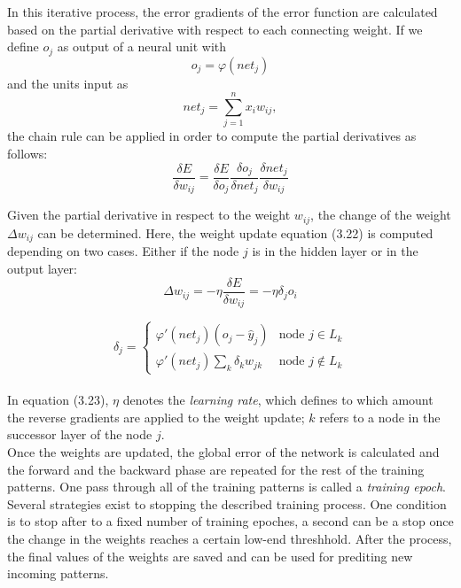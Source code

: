 In this iterative process, the error gradients of the error function are calculated based on the partial derivative with respect to each connecting weight. If we define $o_j$ as output of a neural unit with
\begin{equation}
  o_j = \varphi(net_j)
\end{equation}
and the units input as 
\begin{equation}
  net_j = \sum_{j=1}^{n}x_{i}w_{ij},
\end{equation}
the chain rule can be applied in order to compute the partial derivatives as follows:
\begin{equation}
  \frac{\delta E}{\delta w_{ij}} = \frac{\delta E}{\delta o_j} \frac{\delta o_j}{\delta net_j} \frac{\delta net_j}{\delta w_{ij}}
\end{equation}

Given the partial derivative in respect to the weight $w_{ij}$, the change of the weight $\Delta w_{ij}$ can be determined. Here, the weight update equation (3.22) is computed depending on two cases. Either if the node $j$ is in the hidden layer or in the output layer:
\begin{equation}
  \Delta w_{ij} = -\eta \frac{\delta E}{\delta w_{ij}} = - \eta \delta_j o_i
\end{equation}

\begin{equation}
  \delta_j =
  \begin{cases}
    \varphi'(net_j)(o_j - \hat{y}_j) & \text{node $j \in L_k$}\\
    \varphi'(net_j) \sum_k \delta_k w_{jk} & \text{node $j \notin L_k$}
  \end{cases}
\end{equation}
\\
In equation (3.23), $\eta$ denotes the \textit{learning rate}, which defines to which amount the reverse gradients are applied to the weight update; $k$ refers to a node in the successor layer of the node $j$.\\

Once the weights are updated, the global error of the network is calculated and the forward and the backward phase are repeated for the rest of the training patterns. One pass through all of the training patterns is called a \textit{training
epoch}. Several strategies exist to stopping the described training process. One condition is to stop after to a fixed number of training epoches, a second can be a stop once the change in the weights reaches a certain low-end threshhold. After the process, the final values of the weights are saved and can be used for prediting new incoming patterns.
